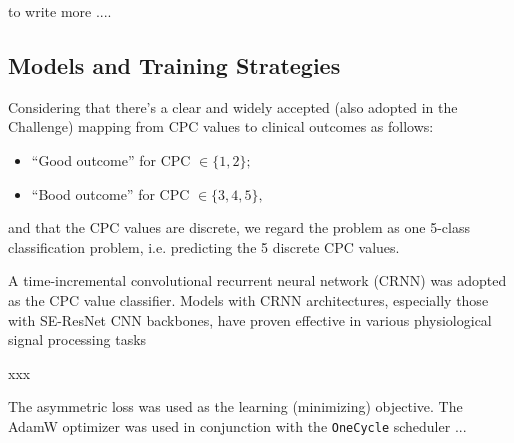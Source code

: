 to write more ....

\subsection{Models and Training Strategies}
\label{subsec:models}

Considering that there's a clear and widely accepted (also adopted in the Challenge) mapping from CPC values to clinical outcomes as follows:
\begin{itemize}
    \item ``Good outcome'' for CPC $\in \{1, 2\};$
    \item ``Bood outcome'' for CPC $\in \{3, 4, 5\},$
\end{itemize}
and that the CPC values are discrete, we regard the problem as one 5-class classification problem, i.e. predicting the 5 discrete CPC values.

A time-incremental convolutional recurrent neural network (CRNN) \cite{Kang_2022_cinc2021_iop} was adopted as the CPC value classifier. Models with CRNN architectures, especially those with SE-ResNet \cite{hu2020senet} CNN backbones, have proven effective in various physiological signal processing tasks \cite{Kang_2022_cinc2021_iop, wen_cinc2022}

xxx

The asymmetric loss \cite{ridnik2021asymmetric_loss} was used as the learning (minimizing) objective. The AdamW optimizer \cite{adamw_amsgrad} was used in conjunction with the \texttt{OneCycle} scheduler \cite{smith2019one_cycle}...

